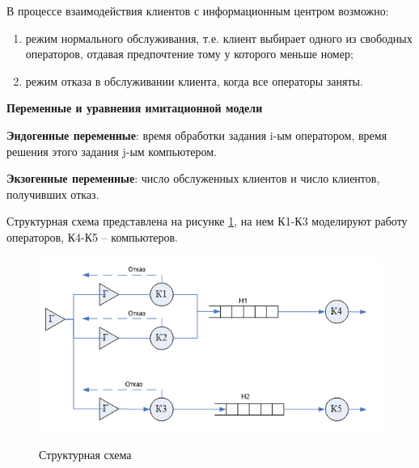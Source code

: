 В процессе взаимодействия клиентов с информационным центром возможно:
\begin{enumerate}
	\item режим нормального обслуживания, т.е. клиент выбирает одного из свободных операторов, отдавая предпочтение тому у которого меньше номер;
	\item режим отказа в обслуживании клиента, когда все операторы заняты.
\end{enumerate}

\textbf{Переменные и уравнения имитационной модели}  

\textbf{Эндогенные переменные}: время обработки задания i-ым оператором, время решения этого задания j-ым компьютером.

\textbf{Экзогенные переменные}: число обслуженных клиентов и число клиентов, получивших отказ.

Структурная схема представлена на рисунке \ref{fig2:image}, на нем К1-К3 моделируют работу операторов, К4-К5 -- компьютеров.
\begin{figure}[h]
	\begin{center}
		{\includegraphics[scale = 0.9]{img/struct.png}}
		\caption{Структурная схема}
		\label{fig2:image}
	\end{center}
\end{figure}

